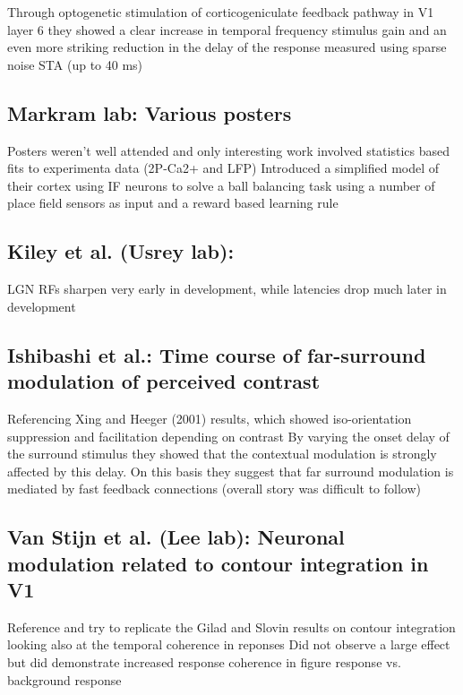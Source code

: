 \documentclass[11pt]{Science}
\begin{document}
Through optogenetic stimulation of corticogeniculate feedback pathway in V1 layer 6 they showed a clear increase in temporal frequency stimulus gain and an even more striking reduction in the delay of the response measured using sparse noise STA (up to 40 ms)

\subsection{Markram lab: Various posters}
\label{sec-4.3}


Posters weren't well attended and only interesting work involved statistics based fits to experimenta data (2P-Ca2+ and LFP)
Introduced a simplified model of their cortex using IF neurons to solve a ball balancing task using a number of place field sensors as input and a reward based learning rule

\subsection{Kiley et al. (Usrey lab):}
\label{sec-4.4}


LGN RFs sharpen very early in development, while latencies drop much later in development

\subsection{Ishibashi et al.: Time course of far-surround modulation of perceived contrast}
\label{sec-4.5}


Referencing Xing and Heeger (2001) results, which showed iso-orientation suppression and facilitation depending on contrast
By varying the onset delay of the surround stimulus they showed that the contextual modulation is strongly affected by this delay.
On this basis they suggest that far surround modulation is mediated by fast feedback connections (overall story was difficult to follow)

\subsection{Van Stijn et al. (Lee lab): Neuronal modulation related to contour integration in V1}
\label{sec-4.6}


Reference and try to replicate the Gilad and Slovin results on contour integration looking also at the temporal coherence in reponses
Did not observe a large effect but did demonstrate increased response coherence in figure response vs. background response
\end{document}

